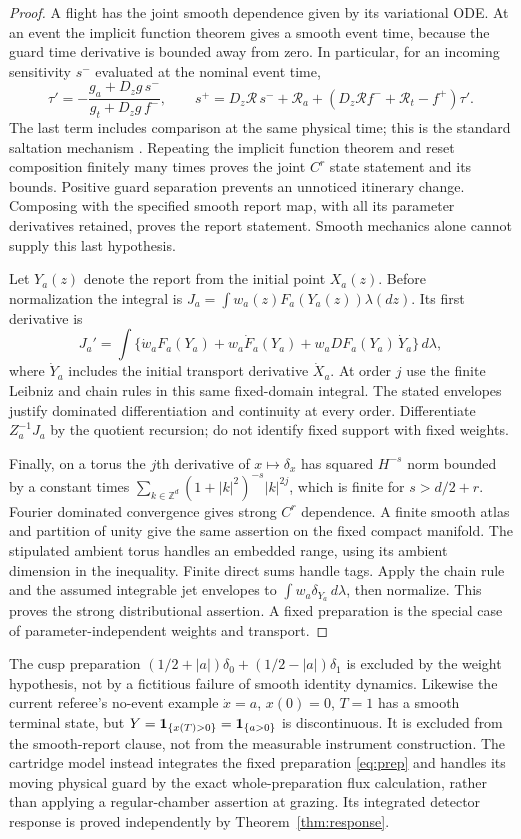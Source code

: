 \begin{proof}
A flight has the joint smooth dependence given by its variational ODE.
At an event the implicit function theorem gives a smooth event time,
because the guard time derivative is bounded away from zero. In particular,
for an incoming sensitivity $s^-$ evaluated at the nominal event time,
\[
 \tau'=-\frac{g_a+D_zg\,s^-}{g_t+D_zg\,f^-},\qquad
 s^+=D_z\mathcal R\,s^-+\mathcal R_a
       +(D_z\mathcal R f^-+\mathcal R_t-f^+)\tau'.
\]
The last term includes comparison at the same physical time; this is the
standard saltation mechanism \cite{KongEtAl}. Repeating the implicit
function theorem and reset composition finitely many times proves the
joint $C^r$ state statement and its bounds. Positive guard separation
prevents an unnoticed itinerary change. Composing with the specified smooth
report map, with all its parameter derivatives retained, proves the report
statement. Smooth mechanics alone cannot supply this last hypothesis.

Let $Y_a(z)$ denote the report from the initial point $X_a(z)$. Before
normalization the integral is $J_a=\int w_a(z)F_a(Y_a(z))\lambda(dz)$.
Its first derivative is
\[
 J_a'=\int\{\dot w_aF_a(Y_a)
       +w_a\dot F_a(Y_a)+w_a DF_a(Y_a)\,\dot Y_a\}\,d\lambda,
\]
where $\dot Y_a$ includes the initial transport derivative $\dot X_a$.
At order $j$ use the finite Leibniz and chain rules in this same fixed-domain
integral. The stated envelopes justify dominated differentiation and
continuity at every order. Differentiate $Z_a^{-1}J_a$ by the quotient
recursion; do not identify fixed support with fixed weights.

Finally, on a torus the $j$th derivative of $x\mapsto\delta_x$ has squared
$H^{-s}$ norm bounded by a constant times
$\sum_{k\in\mathbb Z^d}(1+|k|^2)^{-s}|k|^{2j}$, which is finite for
$s>d/2+r$. Fourier dominated convergence gives strong $C^r$ dependence.
A finite smooth atlas and partition of unity give the same assertion on the
fixed compact manifold. The stipulated ambient torus handles an embedded
range, using its ambient dimension in the inequality. Finite direct sums
handle tags. Apply the chain rule and the assumed integrable jet envelopes
to $\int w_a\delta_{Y_a}\,d\lambda$, then normalize. This proves the strong
distributional assertion. A fixed preparation is the special case of
parameter-independent weights and transport.
\end{proof}

The cusp preparation
$(1/2+|a|)\delta_0+(1/2-|a|)\delta_1$ is excluded by the weight hypothesis,
not by a fictitious failure of smooth identity dynamics. Likewise the
current referee's no-event example $\dot x=a$, $x(0)=0$, $T=1$ has a smooth
terminal state, but $Y=\mathbf1_{\{x(T)>0\}}=\mathbf1_{\{a>0\}}$ is discontinuous.
It is excluded from the smooth-report clause, not from the measurable
instrument construction. The cartridge model instead integrates the fixed
preparation \eqref{eq:prep} and handles its moving physical guard by the
exact whole-preparation flux calculation, rather than applying a
regular-chamber assertion at grazing. Its integrated detector response is
proved independently by Theorem~\ref{thm:response}.
